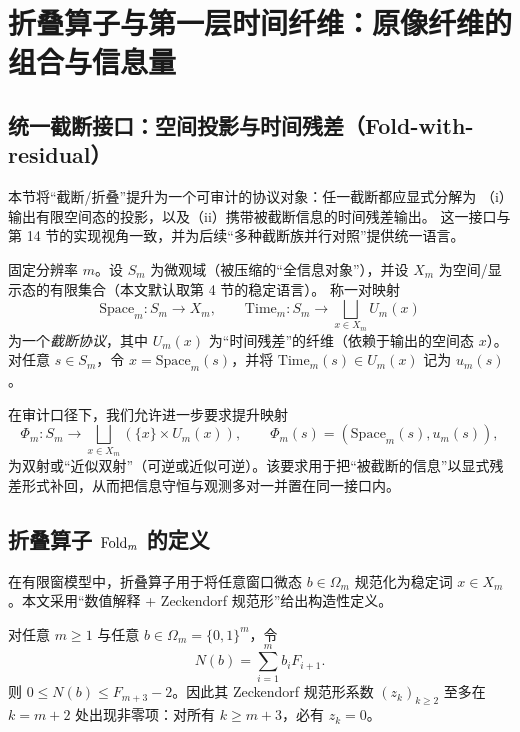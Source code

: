 \section{折叠算子与第一层时间纤维：原像纤维的组合与信息量}

\subsection{统一截断接口：空间投影与时间残差（Fold-with-residual）}

本节将“截断/折叠”提升为一个可审计的协议对象：任一截断都应显式分解为
（i）输出有限空间态的投影，以及（ii）携带被截断信息的时间残差输出。
这一接口与第 14 节的实现视角一致，并为后续“多种截断族并行对照”提供统一语言。

\begin{definition}[截断协议与时间残差]\label{def:truncation_schema}
\AuditTag
固定分辨率 $m$。设 $S_m$ 为微观域（被压缩的“全信息对象”），并设 $X_m$ 为空间/显示态的有限集合（本文默认取第 4 节的稳定语言）。
称一对映射
$$
\mathrm{Space}_m:S_m\to X_m,
\qquad
\mathrm{Time}_m:S_m\to \bigsqcup_{x\in X_m} U_m(x)
$$
为一个\emph{截断协议}，其中 $U_m(x)$ 为“时间残差”的纤维（依赖于输出的空间态 $x$）。
对任意 $s\in S_m$，令 $x=\mathrm{Space}_m(s)$，并将 $\mathrm{Time}_m(s)\in U_m(x)$ 记为 $u_m(s)$。
\par
在审计口径下，我们允许进一步要求提升映射
$$
\Phi_m:S_m\to \bigsqcup_{x\in X_m}(\{x\}\times U_m(x)),\qquad \Phi_m(s)=(\mathrm{Space}_m(s),u_m(s)),
$$
为双射或“近似双射”（可逆或近似可逆）。该要求用于把“被截断的信息”以显式残差形式补回，从而把信息守恒与观测多对一并置在同一接口内。
\end{definition}

\subsection{\texorpdfstring{折叠算子 $\mathrm{Fold}_m$ 的定义}{折叠算子 Fold m 的定义}}

在有限窗模型中，折叠算子用于将任意窗口微态 $b\in\Omega_m$ 规范化为稳定词 $x\in X_m$。本文采用“数值解释 + Zeckendorf 规范形”给出构造性定义。

\begin{lemma}\label{lem:zeckendorf_one_overflow_bit}
\MathTag
对任意 $m\ge 1$ 与任意 $b\in\Omega_m=\{0,1\}^m$，令
$$
N(b)=\sum_{i=1}^{m} b_i F_{i+1}.
$$
则 $0\le N(b)\le F_{m+3}-2$。因此其 Zeckendorf 规范形系数 $(z_k)_{k\ge 2}$ 至多在 $k=m+2$ 处出现非零项：对所有 $k\ge m+3$，必有 $z_k=0$。
\end{lemma}

